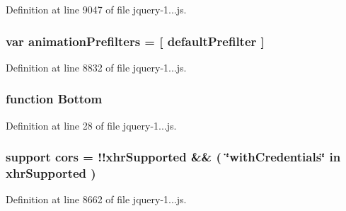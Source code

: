 Definition at line 9047 of file jquery-\/1...\+js.

\subsubsection[{\texorpdfstring{animation\+Prefilters}{animationPrefilters}}]{\setlength{\rightskip}{0pt plus 5cm}var animation\+Prefilters = \mbox{[} {\bf default\+Prefilter} \mbox{]}}\hypertarget{_scripts_2jquery-1_810_82_8js_adb3f17c5359fbc12b7043b6969553d78}{}\label{_scripts_2jquery-1_810_82_8js_adb3f17c5359fbc12b7043b6969553d78}


Definition at line 8832 of file jquery-\/1...\+js.

\subsubsection[{\texorpdfstring{Bottom}{Bottom}}]{\setlength{\rightskip}{0pt plus 5cm}function Bottom}\hypertarget{_scripts_2jquery-1_810_82_8js_aff76c1cba4a00c678dfce0e0c5a5538a}{}\label{_scripts_2jquery-1_810_82_8js_aff76c1cba4a00c678dfce0e0c5a5538a}


Definition at line 28 of file jquery-\/1...\+js.

\subsubsection[{\texorpdfstring{cors}{cors}}]{ support cors = !!{\bf xhr\+Supported} \&\& ( \char`\"{}with\+Credentials\char`\"{} in {\bf xhr\+Supported} )}\hypertarget{_scripts_2jquery-1_810_82_8js_a4b8fe3fdfa8cb03b32c86e4a36575dfc}{}\label{_scripts_2jquery-1_810_82_8js_a4b8fe3fdfa8cb03b32c86e4a36575dfc}


Definition at line 8662 of file jquery-\/1...\+js.

